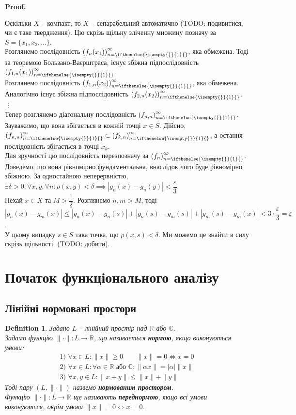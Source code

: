 \documentclass[a4paper, 10pt]{article}
\makeatletter
\theoremstyle{theoremdd}
\theoremstyle{theoremdd}
\newtheorem{definition}[theorem]{Definition}
\theoremstyle{theoremdd}
\theoremstyle{theoremdd}
\theoremstyle{theoremdd}
\theoremstyle{theoremdd}
\theoremstyle{theoremdd}
\theoremstyle{theoremdd}
\newcommand{\sequence}[2][]{\left({#2}\right)_{n=\ifthenelse{\isempty{#1}}{1}{#1}}^{\infty}}
\renewenvironment{proof}[1][Proof.\\]{\par
\pushQED{\hfill \qed}%
\normalfont \topsep6\p@\@plus6\p@\relax
\trivlist
\item\relax
{\bfseries
#1\@addpunct{.}}\hspace\labelsep\ignorespaces
}{%
\popQED\endtrivlist\@endpefalse
}
\makeatother
\begin{document}
\begin{proof}
Оскільки $X$ -- компакт, то $X$ -- сепарабельний автоматично (TODO: подивитися, чи є таке твердження). Цю скрізь щільну зліченну множину позначу за $S = \{x_1,x_2,\dots\}$.\\
Розглянемо послідовність $\sequence{f_n(x_1)}$, яка обмежена. Тоді за теоремою Бользано-Ваєрштраса, існує збіжна підпослідовність $\sequence{f_{1,n}(x_1)}$.\\
Розглянемо послідовність $\sequence{f_{1,n}(x_2)}$, яка обмежена. Аналогічно існує збіжна підпослідовність $\sequence{f_{2,n}(x_2)}$.\\
\vdots \\
Тепер розглянемо діагональну послідовність $\sequence{f_{n,n}}$. Зауважимо, що вона збігається в кожній точці $x \in S$. Дійсно, $\sequence{f_{n,n}} \subset \sequence{f_{k,n}}$, а остання послідовність збігається в точці $x_k$.
\bigskip \\
Для зручності цю послідовність перезпозначу за $\sequence{f_n}$. Доведемо, що вона рівномірно фундаментальна, внаслідок чого буде рівномірно збіжною. За одностайною неперервністю, $\exists \delta > 0: \forall x,y, \forall n: \rho(x,y) < \delta \implies |g_n(x) - g_n(y)| < \dfrac{\varepsilon}{3}$.\\
Нехай $x \in X$ та $M > \dfrac{1}{\delta}$. Розглянемо $n,m > M$, тоді\\
$|g_n(x) - g_m(x)| \leq |g_n(x) - g_n(s)| + |g_n(s) - g_m(s)| + |g_m(s) - g_m(x)| < 3 \cdot \dfrac{\varepsilon}{3} = \varepsilon$.\\
У цьому випадку $s \in S$ така точка, що $\rho(x,s) < \delta$. Ми можемо це знайти в силу скрізь щільності.
(TODO: добити).
\end{proof}
\newpage

\section{Початок функціонального аналізу}
\subsection{Лінійні нормовані простори}
\begin{definition}
Задано $L$ -- лінійний простір над $\mathbb{R}$ або $\mathbb{C}$.\\
Задамо функцію $\| \cdot \| \colon L \to \mathbb{R}$, що називається \textbf{нормою}, якщо виконуються умови:
\begin{align*}
\text{1) } \forall x \in L: \|x\| \geq 0 \qquad \|x\| = 0 \iff x = 0 \\
\text{2) } \forall x \in L: \forall \alpha \in \mathbb{R} \text{ або } \mathbb{C}: \|\alpha x\| = |\alpha| \|x\| \\
\text{3) } \forall x,y \in L: \|x+y\| \leq \|x\| + \|y\|
\end{align*}
Тоді пару $(L, \|\cdot \|)$ назвемо \textbf{нормованим простором}.\\
Функцію $\| \cdot \| \colon L \to \mathbb{R}$ ще називають \textbf{переднормою}, якщо всі умови виконуються, окрім умови $\|x\| = 0 \iff x = 0$.
\end{definition}
\end{document}
